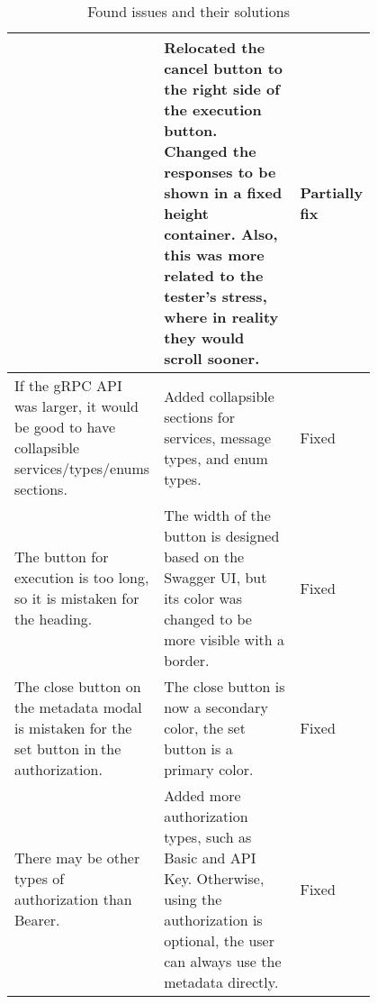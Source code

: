 \begin{table}[!ht]
{\begin{tabular}{|p{0.4\linewidth}|p{0.4\linewidth}|l|}
            & Relocated the cancel button to the right side of the execution button.
            Changed the responses to be shown in a fixed height container.
            Also, this was more related to the tester's stress, where in reality they would scroll sooner.
            & Partially fix \\
            \hline
            If the gRPC API was larger, it would be good to have collapsible services/types/enums sections.
            & Added collapsible sections for services, message types, and enum types.
            & Fixed \\
            \hline
            The button for execution is too long, so it is mistaken for the heading.
            & The width of the button is designed based on the Swagger UI, but its color was changed to be more visible with a border.
            & Fixed \\
            \hline
            The close button on the metadata modal is mistaken for the set button in the authorization.
            & The close button is now a secondary color, the set button is a primary color.
            & Fixed \\
            \hline
            There may be other types of authorization than Bearer.
            & Added more authorization types, such as Basic and API Key.
            Otherwise, using the authorization is optional, the user can always use the metadata directly.
            & Fixed \\
            \hline
        \end{tabular}
    }
    \caption{Found issues and their solutions}
    \label{tab:user-testing-issues}
\end{table}